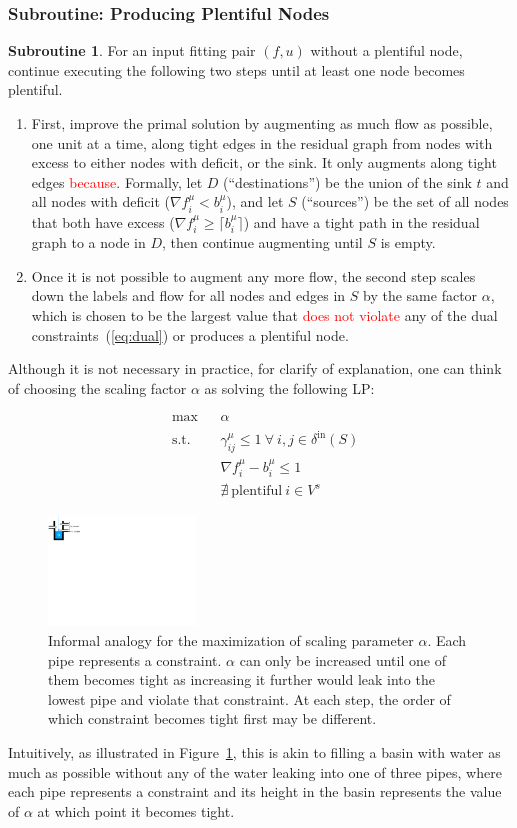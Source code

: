 \documentclass[11pt]{article}
\theoremstyle{definition}
\theoremstyle{definition}
\newtheorem{subroutine}{Subroutine}
\newcommand{\fu}{f^{\mu}}
\newcommand{\nfiu}{\nabla \fu_i}
\newcommand{\biu}{b_{i}^{\mu}}
\newcommand{\din}{\delta^{\text{in}}}
\newcommand{\vsink}{V^{s}}
\newcommand{\rewrite}[1]{\textcolor{red}{#1}}
\newcommand{\lpeq}[1] {
\begin{equation*}
\begin{aligned}
#1
\end{aligned}
\end{equation*}
}
\newcommand{\lpone}[3] {
& \underset{}{\text{#1}}
&& #2 \\
& \text{s.t.}
&& #3 
}
\newcommand{\lptwo}[4] {
\lpone{#1}{#2}{#3}\\
&&& #4
}
\newcommand{\lpthree}[5] {
\lptwo{#1}{#2}{#3}{#4}\\
&&& #5
}
\begin{document}
\subsubsection{Subroutine: Producing Plentiful Nodes}
\label{sec:sub-ppn}

\begin{subroutine}
For an input fitting pair $(f,u)$ without a plentiful node,
continue executing the following two steps until at least one node becomes
plentiful.
\begin{enumerate}
\item First, improve the primal solution by augmenting as much flow as possible,
one unit at a time, along tight edges in the residual graph 
from nodes with excess to either nodes with deficit, or the sink.
It only augments along tight edges \rewrite{because}. Formally, let
$D$ (``destinations'') be the union of the sink $t$ and all nodes with 
deficit ($\nabla f_i^{\mu} < b_i^{\mu}$), and let $S$ (``sources'') be
the set of all nodes that both have excess ($\nabla f_i^{\mu} \ge \lceil b_i^{\mu} \rceil$)
and have a tight path in the residual graph to a node in $D$, then
continue augmenting until $S$ is empty.
\item Once it is not possible to augment any more flow, the second step scales down
the labels and flow for all nodes and edges in $S$ by the same factor $\alpha$,
which is chosen to be the largest value that \rewrite{does not violate} any of the dual
constraints~(\ref{eq:dual}) or produces a plentiful node.
\end{enumerate}
\end{subroutine}

Although it is not necessary in practice, for clarify of explanation, one can think of choosing the scaling factor $\alpha$ as solving
the following LP:
\lpeq{\lpthree{max}
{\alpha}
{\gamma_{ij}^{\mu} \le 1\ \forall\ i,j \in \din(S)}
{\nfiu - \biu \le 1}
{\nexists\ \text{plentiful}\ i \in \vsink}
}
\begin{figure}[b!]
\centering
\includegraphics[width=0.35\textwidth]{figs/water.pdf}
\caption{
\label{fig:alpha}
Informal analogy for the maximization of scaling parameter $\alpha$.
Each pipe represents a constraint. $\alpha$ can only be increased until
one of them becomes tight as increasing it further would leak into
the lowest pipe and violate that constraint.
At each step, the order of which constraint becomes tight first may be different.
}
\end{figure}
Intuitively, as illustrated in Figure~\ref{fig:alpha}, this is akin to filling
a basin with water as much as possible without any of the water leaking into one
of three pipes, where each pipe represents a constraint and its height in the basin
represents the value of $\alpha$ at which point it becomes tight.
\end{document}
